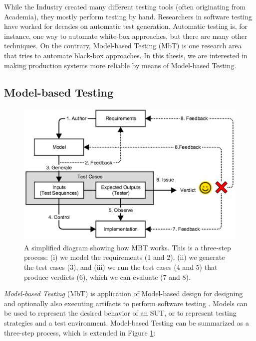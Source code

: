 While the Industry created many different testing tools (often
originating from Academia), they mostly perform testing by hand.
Researchers in software testing have worked for decades on
automatic test generation. Automatic testing is, for instance,
one way to automate white-box approaches, but there are many
other techniques. On the contrary, Model-based Testing (MbT) is
one research area that tries to automate black-box approaches.
In this thesis, we are interested in making production systems
more reliable by means of Model-based Testing.

\subsection{Model-based Testing}
\label{sec:related:testing:mbt}

\begin{figure}[ht]
    \begin{center}
    \includegraphics[width=1.0\linewidth]{figures/mbt.png}
    \end{center}

    \caption{A simplified diagram showing how MBT works. This is
    a three-step process: (i) we model the requirements (1 and
    2), (ii) we generate the test cases (3), and (iii) we run the
    test cases (4 and 5) that produce verdicts (6), which we can
    evaluate (7 and 8).}
    \label{fig:mbt}
\end{figure}

\textit{Model-based Testing} (MbT) is application of Model-based
design for designing and optionally also executing artifacts to
perform software testing \cite{Jorgensen:1995:STC:526521}.
Models can be used to represent the desired behavior of an SUT,
or to represent testing strategies and a test environment.
Model-based Testing can be summarized as a three-step process,
which is extended in Figure \ref{fig:mbt}:

